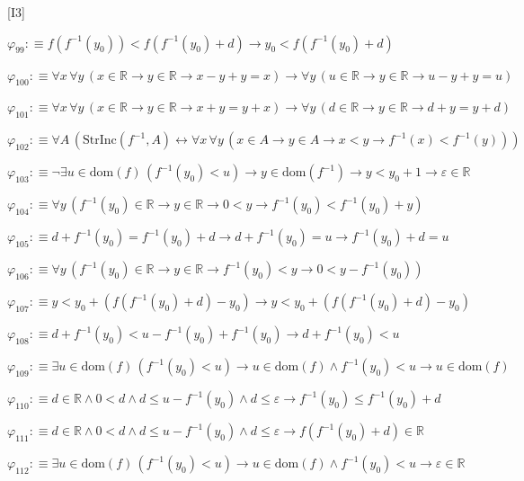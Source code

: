 \begin{fullproof}{[I3]}
\begin{abbrevlist}
\item $\varphi_{99} :\equiv f(f^{-1}(y_{0})) < f(f^{-1}(y_{0}) + d) \to y_{0} < f(f^{-1}(y_{0}) + d)$
\item $\varphi_{100} :\equiv \forall x\,\forall y\,(x \in \mathbb{R} \to y \in \mathbb{R} \to x - y + y = x) \to \forall y\,(u \in \mathbb{R} \to y \in \mathbb{R} \to u - y + y = u)$
\item $\varphi_{101} :\equiv \forall x\,\forall y\,(x \in \mathbb{R} \to y \in \mathbb{R} \to x + y = y + x) \to \forall y\,(d \in \mathbb{R} \to y \in \mathbb{R} \to d + y = y + d)$
\item $\varphi_{102} :\equiv \forall A\,(\mathrm{StrInc}(f^{-1},A) \leftrightarrow \forall x\,\forall y\,(x \in A \to y \in A \to x < y \to f^{-1}(x) < f^{-1}(y)))$
\item $\varphi_{103} :\equiv \neg \exists u \in \mathrm{dom}(f)\,(f^{-1}(y_{0}) < u) \to y \in \mathrm{dom}(f^{-1}) \to y < y_{0} + 1 \to \varepsilon \in \mathbb{R}$
\item $\varphi_{104} :\equiv \forall y\,(f^{-1}(y_{0}) \in \mathbb{R} \to y \in \mathbb{R} \to 0 < y \to f^{-1}(y_{0}) < f^{-1}(y_{0}) + y)$
\item $\varphi_{105} :\equiv d + f^{-1}(y_{0}) = f^{-1}(y_{0}) + d \to d + f^{-1}(y_{0}) = u \to f^{-1}(y_{0}) + d = u$
\item $\varphi_{106} :\equiv \forall y\,(f^{-1}(y_{0}) \in \mathbb{R} \to y \in \mathbb{R} \to f^{-1}(y_{0}) < y \to 0 < y - f^{-1}(y_{0}))$
\item $\varphi_{107} :\equiv y < y_{0} + (f(f^{-1}(y_{0}) + d) - y_{0}) \to y < y_{0} + (f(f^{-1}(y_{0}) + d) - y_{0})$
\item $\varphi_{108} :\equiv d + f^{-1}(y_{0}) < u - f^{-1}(y_{0}) + f^{-1}(y_{0}) \to d + f^{-1}(y_{0}) < u$
\item $\varphi_{109} :\equiv \exists u \in \mathrm{dom}(f)\,(f^{-1}(y_{0}) < u) \to u \in \mathrm{dom}(f) \land f^{-1}(y_{0}) < u \to u \in \mathrm{dom}(f)$
\item $\varphi_{110} :\equiv d \in \mathbb{R} \land 0 < d \land d \leq u - f^{-1}(y_{0}) \land d \leq \varepsilon \to f^{-1}(y_{0}) \leq f^{-1}(y_{0}) + d$
\item $\varphi_{111} :\equiv d \in \mathbb{R} \land 0 < d \land d \leq u - f^{-1}(y_{0}) \land d \leq \varepsilon \to f(f^{-1}(y_{0}) + d) \in \mathbb{R}$
\item $\varphi_{112} :\equiv \exists u \in \mathrm{dom}(f)\,(f^{-1}(y_{0}) < u) \to u \in \mathrm{dom}(f) \land f^{-1}(y_{0}) < u \to \varepsilon \in \mathbb{R}$

\end{abbrevlist}
\end{fullproof}
